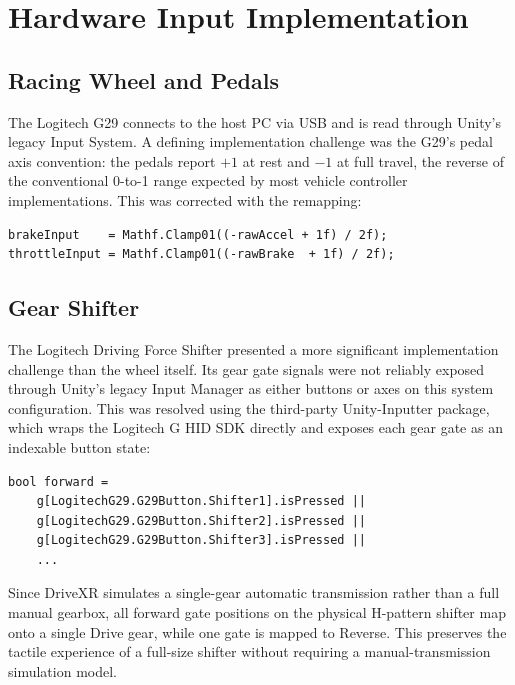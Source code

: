 \section{Hardware Input Implementation}

\subsection{Racing Wheel and Pedals}
The Logitech G29 connects to the host PC via USB and is read through Unity's legacy Input System. A defining implementation challenge was the G29's pedal axis convention: the pedals report $+1$ at rest and $-1$ at full travel, the reverse of the conventional 0-to-1 range expected by most vehicle controller implementations. This was corrected with the remapping:

\begin{verbatim}
brakeInput    = Mathf.Clamp01((-rawAccel + 1f) / 2f);
throttleInput = Mathf.Clamp01((-rawBrake  + 1f) / 2f);
\end{verbatim}

\subsection{Gear Shifter}
The Logitech Driving Force Shifter presented a more significant implementation challenge than the wheel itself. Its gear gate signals were not reliably exposed through Unity's legacy Input Manager as either buttons or axes on this system configuration. This was resolved using the third-party Unity-Inputter package, which wraps the Logitech G HID SDK directly and exposes each gear gate as an indexable button state:

\begin{verbatim}
bool forward =
    g[LogitechG29.G29Button.Shifter1].isPressed ||
    g[LogitechG29.G29Button.Shifter2].isPressed ||
    g[LogitechG29.G29Button.Shifter3].isPressed ||
    ...
\end{verbatim}

Since DriveXR simulates a single-gear automatic transmission rather than a full manual gearbox, all forward gate positions on the physical H-pattern shifter map onto a single Drive gear, while one gate is mapped to Reverse. This preserves the tactile experience of a full-size shifter without requiring a manual-transmission simulation model.


